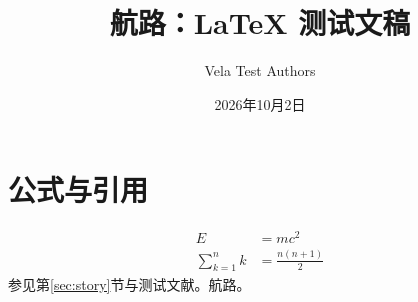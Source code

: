 \documentclass[UTF8]{ctexart}
\title{航路：LaTeX 测试文稿}
\author{Vela Test Authors}
\date{2026年10月2日}
\begin{document}
\maketitle
\tableofcontents

\section{公式与引用}
\label{sec:math}
\begin{align}
E &= mc^2 \\
\sum_{k=1}^{n} k &= \frac{n(n+1)}{2}
\end{align}
参见第\ref{sec:story}节与测试文献\cite{vela2026}。航路。


\printindex
\end{document}
